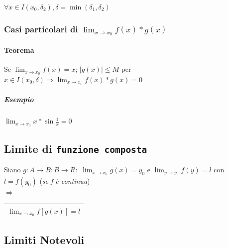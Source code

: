 $\forall x \in I(x_0,\delta_2), \delta = \min (\delta_1,\delta_2)$
\subsubsection{Casi particolari di $\lim_{x\to x_0} f(x)*g(x)$}
\paragraph{Teorema}
Se $\lim_{x\to x_0} f(x)=x$; $|g(x)|\leq M$ per $x\in I(x_0,\delta)\Rightarrow
\lim_{x\to x_0}f(x)*g(x)=0$
\subparagraph{Esempio} $\lim_{x\to x_0}x*\sin\frac{1}{x}=0$
\subsection{Limite di \texttt{funzione composta}}
Siano $g:A\to B:B\to R:$ $\lim_{x\to x_0}g(x)=y_0$ e $\lim_{y\to y_0}f(y)=l$
con $l=f(y_0)$ (\textit{se f è continua})\\
$\Rightarrow$\begin{tabular}{|l|}
	\hline$\lim_{x\to x_0}f[g(x)]=l$\\\hline
\end{tabular}
\subsection{Limiti Notevoli}
